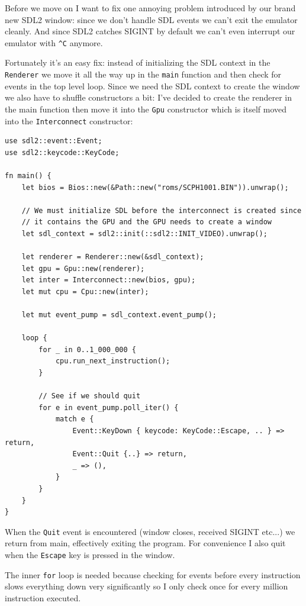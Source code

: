 \documentclass[a4paper]{article}
\newcommand{\code}[1] {\texttt{#1}}
\begin{document}
Before we move on I want to fix one annoying problem introduced by our
brand new SDL2 window: since we don't handle SDL events we can't exit
the emulator cleanly. And since SDL2 catches SIGINT by default we
can't even interrupt our emulator with \verb|^C| anymore.

Fortunately it's an easy fix: instead of initializing the SDL context
in the \code{Renderer} we move it all the way up in the \code{main}
function and then check for events in the top level loop. Since we
need the SDL context to create the window we also have to shuffle
constructors a bit: I've decided to create the renderer in the main
function then move it into the \code{Gpu} constructor which is itself
moved into the \code{Interconnect} constructor:

\begin{lstlisting}
use sdl2::event::Event;
use sdl2::keycode::KeyCode;

fn main() {
    let bios = Bios::new(&Path::new("roms/SCPH1001.BIN")).unwrap();

    // We must initialize SDL before the interconnect is created since
    // it contains the GPU and the GPU needs to create a window
    let sdl_context = sdl2::init(::sdl2::INIT_VIDEO).unwrap();

    let renderer = Renderer::new(&sdl_context);
    let gpu = Gpu::new(renderer);
    let inter = Interconnect::new(bios, gpu);
    let mut cpu = Cpu::new(inter);

    let mut event_pump = sdl_context.event_pump();

    loop {
        for _ in 0..1_000_000 {
            cpu.run_next_instruction();
        }

        // See if we should quit
        for e in event_pump.poll_iter() {
            match e {
                Event::KeyDown { keycode: KeyCode::Escape, .. } => return,
                Event::Quit {..} => return,
                _ => (),
            }
        }
    }
}
\end{lstlisting}

When the \code{Quit} event is encountered (window closes, received
SIGINT etc...) we return from main, effectively exiting the
program. For convenience I also quit when the \code{Escape} key is
pressed in the window.

The inner \code{for} loop is needed because checking for events before
every instruction slows everything down very significantly so I only
check once for every million instruction executed.
\end{document}
